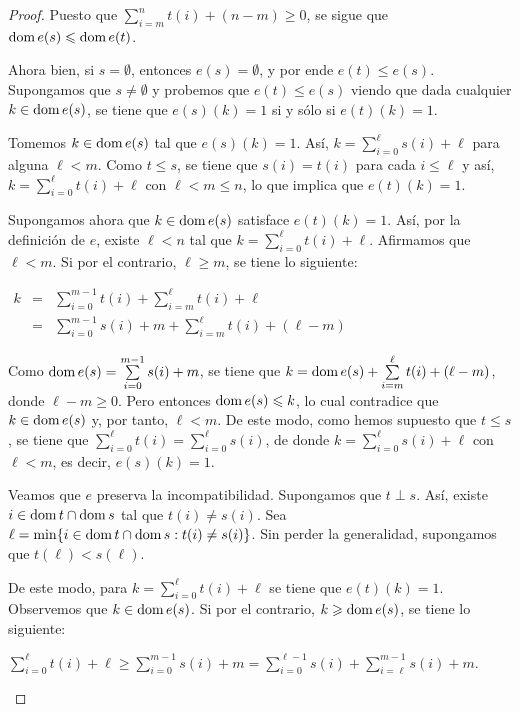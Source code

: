 \documentclass[11pt]{unam_tesis1}
\theoremstyle{MyThmStyle}
\theoremstyle{definition}
\theoremstyle{plain}
\theoremstyle{remark}
\def\dom{\mathop{\rm dom}\nolimits}
\let\leq\leqslant
\let\geq\geqslant
\begin{document}
\begin{proof}
Puesto que $\sum\limits_{i=m}^{n}t(i)+(n-m)\geq 0$, se sigue que $\dom e(s)\leq \dom e(t)$.

Ahora bien, si $s=\emptyset$, entonces $e(s)=\emptyset$, y por ende $e(t)\leq e(s)$. Supongamos que $s\neq \emptyset$ y probemos que $e(t)\leq e(s)$ viendo que dada cualquier $k\in \dom e(s)$, se tiene que $e(s)(k)=1$ si y s\'olo si $e(t)(k)=1$.

Tomemos $k\in \dom e(s)$ tal que $e(s)(k)=1$. As\'i, $k=\sum\limits_{i=0}^{\ell}s(i)+\ell$ para alguna $\ell < m$. Como $t\leq s$, se tiene que $s(i) = t(i)$ para cada $i \leq \ell$ y as\'i,  $k=\sum\limits_{i=0}^{\ell}t(i)+\ell$ con $\ell<m\leq n$, lo que implica que $e(t)(k)=1$.

Supongamos ahora que $k\in \dom e(s)$ satisface $e(t)(k)=1$. As\'i, por la definici\'on de $e$, existe $\ell <n$ tal que $k=\sum\limits_{i=0}^{\ell}t(i)+\ell$. Afirmamos que $\ell < m$. Si por el contrario, $\ell \geq m$, se tiene lo siguiente:


\begin{center}
$\begin{array} {lcl} k & = & \sum\limits_{i=0}^{m-1}t(i)+\sum\limits_{i=m}^{\ell}t(i)+\ell  \\ & = & \sum\limits_{i=0}^{m-1}s(i)+m+\sum\limits_{i=m}^{\ell}t(i)+(\ell-m) \end{array}$
\end{center}


Como $\dom e(s)=\sum\limits_{i=0}^{m-1}s(i)+m$, se tiene que $k=\dom e(s)+\sum\limits_{i=m}^{\ell}t(i)+(\ell-m)$, donde $\ell-m \geq 0$. Pero entonces $\dom e(s)\leq k$, lo cual contradice que $k\in \dom e(s)$ y, por tanto, $\ell < m$. De este modo, como hemos supuesto que $t\leq s$, se tiene que $\sum\limits_{i=0}^{\ell}t(i)=\sum\limits_{i=0}^{\ell}s(i)$, de donde $k=\sum\limits_{i=0}^{\ell}s(i)+\ell$ con $\ell<m$, es decir, $e(s)(k)=1$.

Veamos que $e$ preserva la incompatibilidad. Supongamos que $t\perp s$. As\'i, existe $i\in \dom t\cap \dom s$ tal que $t(i)\neq s(i)$. Sea $\ell= \min \{i\in \dom t\cap \dom s: t(i)\neq s(i) \}$. Sin perder la generalidad, supongamos que $t(\ell)<s(\ell)$.

De este modo, para $k=\sum\limits_{i=0}^{\ell}t(i)+\ell$ se tiene que $e(t)(k)=1$. Observemos que $k\in \dom e(s)$. Si por el contrario, $k\geq \dom e(s)$, se tiene lo siguiente:

\begin{center}
$\sum\limits_{i=0}^{\ell}t(i)+ \ell \geq \sum\limits_{i=0}^{m-1}s(i)+m = \sum\limits_{i=0}^{\ell-1}s(i)+\sum\limits_{i=\ell}^{m-1}s(i)+m$.
\end{center}



\end{proof}
\end{document}
